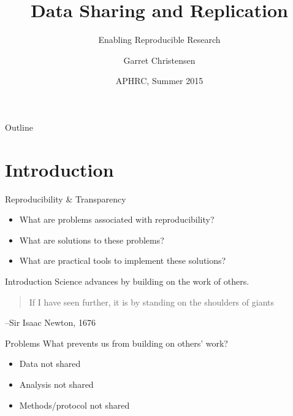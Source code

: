\documentclass{beamer}
\title[Short Paper Title] %
{Data Sharing and Replication}
\subtitle
{Enabling Reproducible Research} %
\author[Christensen] %
{Garret Christensen\inst{1}}
\institute[UC Berkeley, Berkely Initiatiative for Transparency in the Social Sciences] %
{
  \inst{1}%
  UC Berkeley: Berkely Initiatiative for Transparency in the Social Sciences\\
  Berkeley Institute for Data Science
}
\date[Short Occasion] %
{APHRC, Summer 2015}
\begin{document}


\begin{frame}
  \titlepage
\end{frame}

\begin{frame}{Outline}
  \tableofcontents
\end{frame}


\section{Introduction}
\begin{frame}{Reproducibility \& Transparency}
\begin{itemize}
\item What are problems associated with reproducibility?
\item What are solutions to these problems?
\item What are practical tools to implement these solutions?
\end{itemize}
\end{frame}
\begin{frame}{Introduction}
Science advances by building on the work of others. 
\vspace{0.5in}


\begin{quote}
If I have seen further, it is by standing on the shoulders of giants
\end{quote}
\begin{flushright}
--Sir Isaac Newton, 1676
\end{flushright}
\end{frame}

\begin{frame}{Problems}
What prevents us from building on others' work?
\begin{itemize}[<.->]
 \item Data not shared
 \item Analysis not shared
 \item Methods/protocol not shared 
\end{itemize}
\end{frame}
\end{document}
